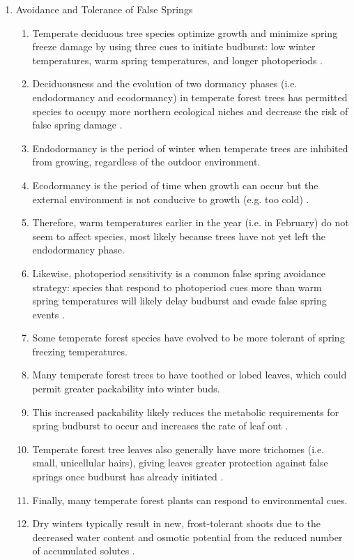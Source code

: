\documentclass{article}\usepackage[]{graphicx}\usepackage[]{color}
\begin{document}
\begin{enumerate}
\item Avoidance and Tolerance of False Springs
\begin {enumerate}
\item Temperate deciduous tree species optimize growth and minimize spring freeze damage by using three cues to initiate budburst: low winter temperatures, warm spring temperatures, and longer photoperiods \citep{Cleland2007, Polgar2011}.
\item Deciduousness and the evolution of two dormancy phases (i.e. endodormancy and ecodormancy) in temperate forest trees has permitted species to occupy more northern ecological niches and decrease the risk of false spring damage \citep{Samish1954}.
\item Endodormancy is the period of winter when temperate trees are inhibited from growing, regardless of the outdoor environment.
\item Ecodormancy is the period of time when growth can occur but the external environment is not conducive to growth (e.g. too cold) \citep{Basler2012}.
\item Therefore, warm temperatures earlier in the year (i.e. in February) do not seem to affect species, most likely because trees have not yet left the endodormancy phase.
\item Likewise, photoperiod sensitivity is a common false spring avoidance strategy: species that respond to photoperiod cues more than warm spring temperatures will likely delay budburst and evade false spring events \citep{Basler2014}.
\\
\item Some temperate forest species have evolved to be more tolerant of spring freezing temperatures.
\item Many temperate forest trees to have toothed or lobed leaves, which could permit greater packability into winter buds.
\item This increased packability likely reduces the metabolic requirements for spring budburst to occur and increases the rate of leaf out \citep{Edwards2017}.
\item Temperate forest tree leaves also generally have more trichomes (i.e. small, unicellular hairs), giving leaves greater protection against false springs once budburst has already initiated \citep{Agrawal2004}.
\item Finally, many temperate forest plants can respond to environmental cues.
\item Dry winters typically result in new, frost-tolerant shoots due to the decreased water content and osmotic potential from the reduced number of accumulated solutes \citep{Morin2007, Hofmann2015}.

\end{enumerate}
\end{enumerate}
\end{document}
